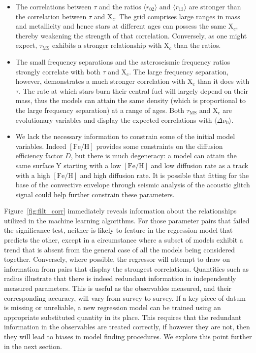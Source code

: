 \begin{itemize}
\item The correlations between $\tau$ and the ratios ${\langle r_{02}\rangle}$ and ${\langle r_{13}\rangle}$ are stronger than the correlation between $\tau$ and  X$_c$. 
The grid comprises large ranges in mass and metallicity and hence stars at different ages can possess the same X$_c$, thereby weakening the strength of that correlation.
Conversely, as one might expect,  $\tau_{\text{MS}}$ exhibits a stronger relationship with X$_c$ than the ratios. 

\item The small frequency separations and the asteroseismic frequency ratios strongly correlate with both $\tau$ and X$_c$. The large frequency separation, however, demonstrates a much stronger correlation with X$_c$ than it does with $\tau$. The rate at which stars burn their central fuel will largely depend on their mass, thus the 
models can attain the same density (which is proportional to the large frequency separation) at a range of ages. Both $\tau_{\text{MS}}$ and X$_c$ are evolutionary variables and display the expected correlations with ${\langle\Delta\nu_0\rangle}$. 

\item We lack the necessary information to constrain some of the initial model variables. Indeed ${[\text{Fe/H}]}$ provides some constraints on the diffusion efficiency factor $D$, but there is much degeneracy: a model can attain the same surface Y starting with a low ${[\text{Fe/H}]}$ and low diffusion rate as a track with a high ${[\text{Fe/H}]}$ and high diffusion rate. It is possible that fitting for the base of the convective envelope through seismic analysis of the acoustic glitch signal \citep{2014ApJ...782...18M, 2014ApJ...794..114V} could help further constrain these parameters. 


\end{itemize}

Figure~\ref{fig:filt_corr} immediately reveals information about the relationships utilized in the machine learning algorithms. 
For those parameter pairs that failed the significance test, neither is likely to feature in the regression model that predicts the other, except in a circumstance where a subset of models exhibit a trend that is absent from the general case of all the models being considered together.
Conversely, where possible, the regressor will attempt to draw on information from pairs that display the strongest correlations.
Quantities such as radius illustrate that there is indeed redundant information in independently measured parameters.
This is useful as the observables measured, and their corresponding accuracy, will vary from survey to survey. 
If a key piece of datum is missing or unreliable, a new regression model can be trained using an appropriate substituted quantity in its place.   
This requires that the redundant information in the observables are treated correctly, if however they are not, then they will lead to biases in model finding procedures. We explore this point further in the next section.  


